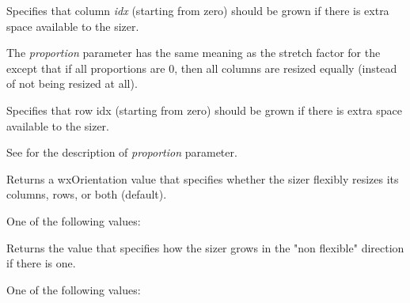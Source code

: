 
Specifies that column {\it idx} (starting from zero) should be grown if
there is extra space available to the sizer.

The {\it proportion} parameter has the same meaning as the stretch factor for
the  except that if all proportions are $0$,
then all columns are resized equally (instead of not being resized at all).

\label{wxflexgridsizeraddgrowablerow}


Specifies that row idx (starting from zero) should be grown if there
is extra space available to the sizer.

See  for the description
of {\it proportion} parameter.

\label{wxflexgridsizergetflexibledrection}


Returns a wxOrientation value that specifies whether the sizer flexibly
resizes its columns, rows, or both (default).


One of the following values:

\begin{twocollist}
\end{twocollist}




\label{wxflexgridsizergetnonflexiblegrowmode}


Returns the value that specifies how the sizer grows in the "non flexible"
direction if there is one.


One of the following values:

